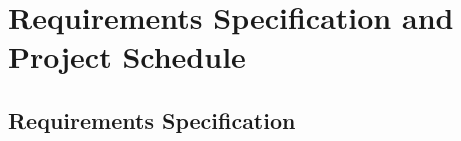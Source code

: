 \chapter{Requirements Specification and Project Schedule}

\theoremstyle{plain}
\theoremsymbol{}
\newtheorem{Rule}[theorem]{Rule}

\pagebreak
\section{Requirements Specification}

\begin{figure}[h!]
    \centering
\end{figure}
\pagebreak

